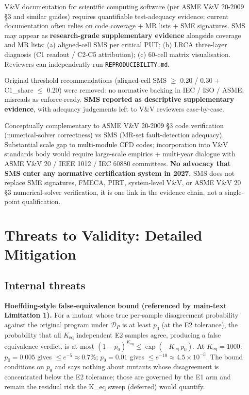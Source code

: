 \documentclass[manuscript,screen,review]{acmart}
\begin{document}
V\&V documentation for scientific computing software (per ASME V\&V
20-2009 §3 and similar guides) requires quantifiable test-adequacy
evidence; current documentation often relies on code coverage + MR lists
+ SME signatures. SMS may appear as \textbf{research-grade supplementary
evidence} alongside coverage and MR lists: (a) aligned-cell SMS per
critical PUT; (b) LRCA three-layer diagnosis (C1 readout / C2-C5
attribution); (c) 60-cell matrix visualisation. Reviewers can
independently run \texttt{REPRODUCIBILITY.md}.

Original threshold recommendations (aligned-cell SMS $\geq$ 0.20 / 0.30 +
C1\_share $\leq$ 0.20) were removed: no normative backing in IEC / ISO /
ASME; misreads as enforce-ready. \textbf{SMS reported as descriptive
supplementary evidence}, with adequacy judgements left to V\&V reviewers
case-by-case.

Conceptually complementary to ASME V\&V 20-2009 §3 code verification
(numerical-solver correctness) vs SMS (MR-set fault-detection adequacy).
Substantial scale gap to multi-module CFD codes; incorporation into V\&V
standards body would require large-scale empirics + multi-year
dialogue with ASME V\&V 20 / IEEE 1012 / IEC 60880 committees.
\textbf{No advocacy that SMS enter any normative certification system in
2027.} SMS does not replace SME signatures, FMECA, PIRT, system-level
V\&V, or ASME V\&V 20 §3 numerical-solver verification, it is one
link in the evidence chain, not a single-point qualification.


\section{Threats to Validity: Detailed Mitigation}\label{f.-threats-to-validity-detailed-mitigation}

\subsection{Internal threats}\label{f.1-internal-threats}

\textbf{Hoeffding-style false-equivalence bound (referenced by
main-text Limitation 1).} For a mutant whose true per-sample
disagreement probability against the original program under $\mathcal{D}_P$ is
at least $p_0$ (at the E2 tolerance), the probability that all
$K_{\mathrm{eq}}$ independent E2 samples agree, producing a false
equivalence verdict, is at most $(1-p_0)^{K_{\mathrm{eq}}} \leq
\exp(-K_{\mathrm{eq}}\,p_0)$. At $K_{\mathrm{eq}} = 1000$: $p_0 =
0.005$ gives $\leq e^{-5} \approx 0.7\%$; $p_0 = 0.01$ gives $\leq
e^{-10} \approx 4.5 \times 10^{-5}$. The bound conditions on $p_0$ and
says nothing about mutants whose disagreement is concentrated below the
E2 tolerance; those are governed by the E1 arm and remain the residual
risk the K\_eq sweep (deferred) would quantify.
\end{document}
